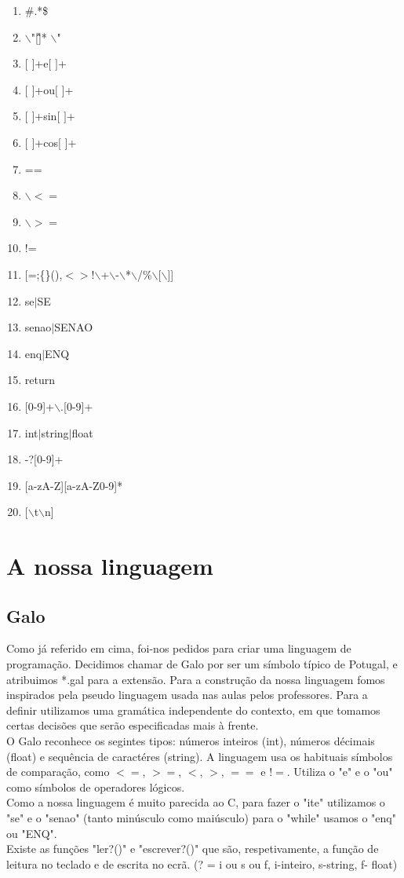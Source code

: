 \documentclass{report}
\begin{document}
\begin{enumerate}
	\item \#.*\$  
	\item $\backslash$"[\^ \"]* $\backslash$"
	\item $[$ $]$+e$[$ $]$+
	\item $[$ $]$+ou$[$ $]$+
	\item $[$ $]$+sin$[$ $]$+
	\item $[$ $]$+cos$[$ $]$+
	\item ==
	\item $\backslash$$<=$
	\item $\backslash$$>=$
	\item !=
	\item $[$=;\{\}(),$<>$!$\backslash$+$\backslash$-$\backslash$*$\backslash$/\%$\backslash$[$\backslash$]]
	\item se$|$SE
	\item senao$|$SENAO 
	\item enq$|$ENQ
	\item return
	\item $[$0-9]+$\backslash$.[0-9]+ 
	\item int$|$string$|$float 
	\item -?$[$0-9]+
	\item $[$a-zA-Z][a-zA-Z0-9]*
	\item $[$$\backslash$t$\backslash$n] 
	
\end{enumerate}

\section{A nossa linguagem}
\subsection{Galo}
\indent
Como já referido em cima, foi-nos pedidos para criar uma linguagem de programação. Decidimos chamar de Galo por ser um símbolo típico de Potugal, e atribuimos *.gal para a extensão. Para a construção da nossa linguagem fomos inspirados pela pseudo linguagem usada nas aulas pelos professores.
\indent
Para a definir utilizamos uma gramática independente do contexto, em que tomamos certas decisões que serão especificadas mais à frente.\\
\indent
O Galo reconhece os segintes tipos: números inteiros (int), números décimais  (float) e sequência de caractéres (string). A linguagem usa os habituais símbolos de comparação, como $<=$, $>=$, $<$, $>$, $==$ e $!=$. Utiliza o "e" e o "ou" como símbolos de operadores lógicos.\\
\indent
Como a nossa linguagem é muito parecida ao C, para fazer o "ite" utilizamos o "se" e o "senao" (tanto minúsculo como maiúsculo) para o "while" usamos o "enq" ou "ENQ".\\
\indent
Existe as funções "ler?()" e "escrever?()" que são, respetivamente, a função de leitura no teclado e de escrita no ecrã. (? = i ou s ou f, i-inteiro, s-string, f- float) \\
\end{document}
